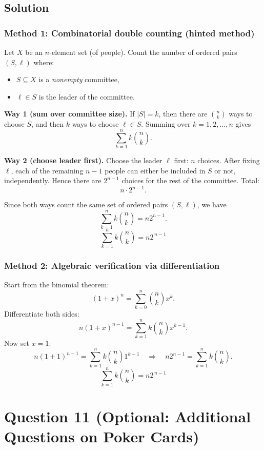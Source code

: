 \documentclass[12pt]{article}
\begin{document}
\subsection{Solution}

\subsubsection{Method 1: Combinatorial double counting (hinted method)}
Let $X$ be an $n$-element set (of people). Count the number of ordered pairs $(S,\ell)$ where:
\begin{itemize}[leftmargin=*]
\item $S\subseteq X$ is a \emph{nonempty} committee,
\item $\ell\in S$ is the leader of the committee.
\end{itemize}

\medskip
\noindent\textbf{Way 1 (sum over committee size).}
If $|S|=k$, then there are $\binom{n}{k}$ ways to choose $S$, and then $k$ ways to choose $\ell\in S$. Summing over $k=1,2,\dots,n$ gives
\[
\sum_{k=1}^{n} k\binom{n}{k}.
\]

\medskip
\noindent\textbf{Way 2 (choose leader first).}
Choose the leader $\ell$ first: $n$ choices. After fixing $\ell$, each of the remaining $n-1$ people can either be included in $S$ or not, independently. Hence there are $2^{n-1}$ choices for the rest of the committee. Total:
\[
n\cdot 2^{n-1}.
\]

Since both ways count the same set of ordered pairs $(S,\ell)$, we have
\[
\sum_{k=1}^{n} k\binom{n}{k}=n2^{n-1}.
\]
\[
\boxed{\sum_{k=1}^{n} k\binom{n}{k}=n2^{\,n-1}}
\]

\subsubsection{Method 2: Algebraic verification via differentiation}
Start from the binomial theorem:
\[
(1+x)^n=\sum_{k=0}^{n}\binom{n}{k}x^k.
\]
Differentiate both sides:
\[
n(1+x)^{n-1}=\sum_{k=1}^{n} k\binom{n}{k}x^{k-1}.
\]
Now set $x=1$:
\[
n(1+1)^{n-1}=\sum_{k=1}^{n} k\binom{n}{k}1^{k-1}
\quad\Longrightarrow\quad
n2^{n-1}=\sum_{k=1}^{n} k\binom{n}{k}.
\]
\[
\boxed{\sum_{k=1}^{n} k\binom{n}{k}=n2^{\,n-1}}
\]

\newpage

\section{Question 11 (Optional: Additional Questions on Poker Cards)}
\end{document}
